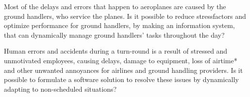 Most of the delays and errors that happen to aeroplanes are caused by the ground handlers,
who service the planes. Is it possible to reduce stressfactors and optimize performance for
ground handlers, by making an information system, that can dynamically manage ground
handlers’ tasks throughout the day?

Human errors and accidents during a turn-round is a result of stressed and unmotivated employees, causing delays, damage to equipment, loss of airtime* and other unwanted annoyances for airlines and ground handling providers. Is it possible to formulate a software solution to resolve these issues by dynamically adapting to non-scheduled situations?